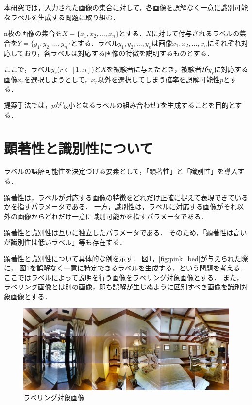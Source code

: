 \documentclass[a4paper,11pt]{jreport}
\begin{document}
本研究では，入力された画像の集合に対して，各画像を誤解なく一意に識別可能なラベルを生成する問題に取り組む．

n枚の画像の集合を\(X = \{x_1, x_2, \ldots, x_n\}\)とする．\(X\)に対して付与されるラベルの集合を\(Y = \{y_1, y_2, \ldots, y_n\}\)とする．ラベル\(y_1, y_2, \ldots, y_n\)は画像\(x_1, x_2, \ldots, x_n\)にそれぞれ対応しており，各ラベルは対応する画像の特徴を説明するものとする．

ここで，ラベル\(y_r\)($r \in [1..n]$)と\(X\)を被験者に与えたとき，被験者が\(y_r\)に対応する画像\(x_r\)を選択しようとして，\(x_r\)以外を選択してしまう確率を誤解可能性\(p\)とする．

提案手法では，\(p\)が最小となるラベルの組み合わせ\(Y\)を生成することを目的とする．

\section{顕著性と識別性について}

ラベルの誤解可能性を決定づける要素として，「顕著性」と「識別性」を導入する．

顕著性は，ラベルが対応する画像の特徴をどれだけ正確に捉えて表現できているかを指すパラメータである．
一方，識別性は，ラベルに対応する画像がそれ以外の画像からどれだけ一意に識別可能かを指すパラメータである．

顕著性と識別性は互いに独立したパラメータである．
そのため，「顕著性は高いが識別性は低いラベル」等も存在する．

顕著性と識別性について具体的な例を示す．
図\ref{fig:white_bed}，\ref*{fig:pink_bed}が与えられた際に，
図\ref{fig:white_bed}を誤解なく一意に特定できるラベルを生成する，という問題を考える．
ここではラベルによって説明を行う画像をラベリング対象画像とする．
また，ラベリング画像とは別の画像，即ち誤解が生じぬように区別すべき画像を識別対象画像とする．

\begin{figure}[H]
	\centering
	\includegraphics[width=0.8\linewidth]{figures/3-2_white_bed.jpg}
	\caption{ラベリング対象画像}
	\label{fig:white_bed}
\end{figure}
\end{document}
